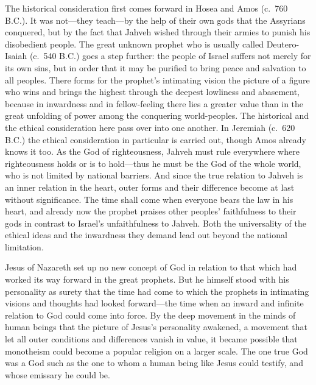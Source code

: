 \documentclass[12pt,a4paper]{book}
\newcommand{\opage}[1]{\marginnote{\footnotesize\textit{[#1]}}}
\begin{document}
The historical consideration first comes forward in Hosea and Amos 
\opage{103}(c.~760 B.C.). It was
not---they teach---by the help of their own gods that the Assyrians conquered, but by the
fact that Jahveh wished through their armies to punish his disobedient people. The great
unknown prophet who is usually called Deutero-Isaiah (c.~540 B.C.) goes a step further:
the people of Israel suffers not merely for its own sins, but in order that it may be
purified to bring peace and salvation to all peoples. There forms for the prophet's
intimating vision the picture of a figure who wins and brings the highest through the
deepest lowliness and abasement, because in inwardness and in fellow-feeling there lies a
greater value than in the great unfolding of power among the conquering world-peoples. The
historical and the ethical consideration here pass over into one another. In Jeremiah
(c.~620 B.C.) the ethical consideration in particular is carried out, though Amos already
knows it too. As the God of righteousness, Jahveh must rule everywhere where righteousness
holds or is to hold---thus he must be the God of the whole world, who is not limited by
national barriers. And since the true relation to Jahveh is an inner relation in the heart,
outer forms and their difference become at last without significance. The time shall come
when everyone bears the law in his heart, and already now the prophet praises other peoples'
faithfulness to their gods in contrast to Israel's unfaithfulness to Jahveh. Both the
universality of the ethical ideas and the inwardness they demand lead out beyond the national
limitation.

Jesus of Nazareth set up no new concept of God in relation to that which had worked its way
forward in the great prophets. But he himself stood with his personality as surety that the
time had come to which the prophets in intimating visions and thoughts had looked
forward---the time when an inward and infinite relation to God could come into force. By the
deep movement in the minds of human beings that the picture of Jesus's personality awakened,
a movement that let all outer conditions and differences vanish in value, it became possible
that monotheism could become a popular religion on a larger scale. The one true God was a God
such as the one to whom a human being like Jesus could testify, and whose emissary he could be.
\end{document}

